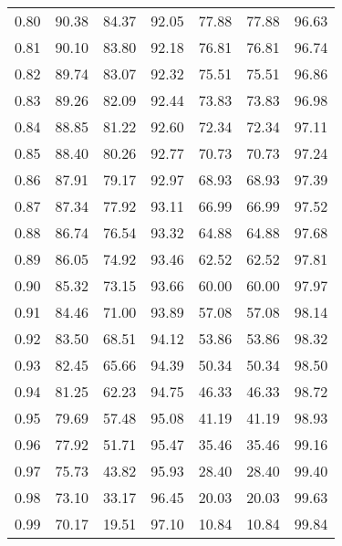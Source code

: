 \begin{tabular}{|c|c|c|c|c|c|c|}
      0.80 &     90.38 &     84.37 &      92.05 &   77.88 &      77.88 &         96.63 \\
      0.81 &     90.10 &     83.80 &      92.18 &   76.81 &      76.81 &         96.74 \\
      0.82 &     89.74 &     83.07 &      92.32 &   75.51 &      75.51 &         96.86 \\
      0.83 &     89.26 &     82.09 &      92.44 &   73.83 &      73.83 &         96.98 \\
      0.84 &     88.85 &     81.22 &      92.60 &   72.34 &      72.34 &         97.11 \\
      0.85 &     88.40 &     80.26 &      92.77 &   70.73 &      70.73 &         97.24 \\
      0.86 &     87.91 &     79.17 &      92.97 &   68.93 &      68.93 &         97.39 \\
      0.87 &     87.34 &     77.92 &      93.11 &   66.99 &      66.99 &         97.52 \\
      0.88 &     86.74 &     76.54 &      93.32 &   64.88 &      64.88 &         97.68 \\
      0.89 &     86.05 &     74.92 &      93.46 &   62.52 &      62.52 &         97.81 \\
      0.90 &     85.32 &     73.15 &      93.66 &   60.00 &      60.00 &         97.97 \\
      0.91 &     84.46 &     71.00 &      93.89 &   57.08 &      57.08 &         98.14 \\
      0.92 &     83.50 &     68.51 &      94.12 &   53.86 &      53.86 &         98.32 \\
      0.93 &     82.45 &     65.66 &      94.39 &   50.34 &      50.34 &         98.50 \\
      0.94 &     81.25 &     62.23 &      94.75 &   46.33 &      46.33 &         98.72 \\
      0.95 &     79.69 &     57.48 &      95.08 &   41.19 &      41.19 &         98.93 \\
      0.96 &     77.92 &     51.71 &      95.47 &   35.46 &      35.46 &         99.16 \\
      0.97 &     75.73 &     43.82 &      95.93 &   28.40 &      28.40 &         99.40 \\
      0.98 &     73.10 &     33.17 &      96.45 &   20.03 &      20.03 &         99.63 \\
      0.99 &     70.17 &     19.51 &      97.10 &   10.84 &      10.84 &         99.84 \\
\bottomrule
\end{tabular}
